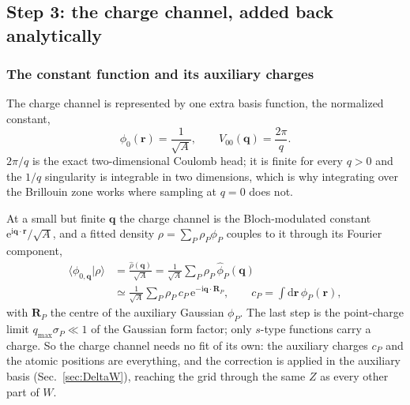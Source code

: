 \documentclass[%
 reprint,
superscriptaddress,
 amsmath,amssymb,
 aps,
prb,
]{revtex4-2}
\newcommand{\br}{\mathbf{r}}
\newcommand{\bR}{\mathbf{R}}
\newcommand{\bq}{\mathbf{q}}
\newcommand{\dd}{\mathrm{d}}
\newcommand{\ii}{\mathrm{i}}
\newcommand{\ee}{\mathrm{e}}
\begin{document}
\subsection{Step 3: the charge channel, added back analytically}
\label{sec:charge}

\subsubsection{The constant function and its auxiliary charges}
\label{sec:Zl0}

The charge channel is represented by one extra basis function, the normalized constant,
\begin{equation}
  \phi_0(\br) = \frac{1}{\sqrt A},\qquad V_{00}(\bq) = \frac{2\pi}{q}.
  \label{eq:phi0}
\end{equation}
$2\pi/q$ is the exact two-dimensional Coulomb head; it is finite for every $q>0$ and the
$1/q$ singularity is integrable in two dimensions, which is why integrating over the Brillouin
zone works where sampling at $q=0$ does not.

At a small but finite $\bq$ the charge channel is the Bloch-modulated constant
$\ee^{\ii\bq\cdot\br}/\sqrt A$, and a fitted density $\rho = \sum_P \rho_P\phi_P$ couples to
it through its Fourier component,
\begin{equation}
\begin{aligned}
  \langle\phi_{0,\bq}|\rho\rangle &= \frac{\hat\rho(\bq)}{\sqrt A}
  = \frac{1}{\sqrt A}\sum_P \rho_P\,\hat\phi_P(\bq)\\
  &\simeq \frac{1}{\sqrt A}\sum_P \rho_P\, c_P\,\ee^{-\ii\bq\cdot\bR_P},\qquad
  c_P = \int\dd\br\,\phi_P(\br),
\end{aligned}
  \label{eq:Zl0}
\end{equation}
with $\bR_P$ the centre of the auxiliary Gaussian $\phi_P$. The last step is the point-charge
limit $q_\mathrm{max}\sigma_P\ll1$ of the Gaussian form factor; only $s$-type functions carry a
charge. So the charge channel needs no fit of its own: the auxiliary charges $c_P$ and the
atomic positions are everything, and the correction is applied in the auxiliary basis
(Sec.~\ref{sec:DeltaW}), reaching the grid through the same $Z$ as every other part of $W$.
\end{document}
